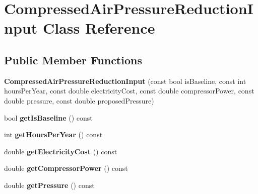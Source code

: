 \hypertarget{class_compressed_air_pressure_reduction_input}{}\section{Compressed\+Air\+Pressure\+Reduction\+Input Class Reference}
\label{class_compressed_air_pressure_reduction_input}
\subsection*{Public Member Functions}
\begin{DoxyCompactItemize}
\item 
\mbox{\label{class_compressed_air_pressure_reduction_input_af3bea875794e64c677c753cf3836b53b}} 
{\bfseries Compressed\+Air\+Pressure\+Reduction\+Input} (const bool is\+Baseline, const int hours\+Per\+Year, const double electricity\+Cost, const double compressor\+Power, const double pressure, const double proposed\+Pressure)
\item 
\mbox{\label{class_compressed_air_pressure_reduction_input_a0ab9cf8226a03688bb37d1f8bd55f488}} 
bool {\bfseries get\+Is\+Baseline} () const
\item 
\mbox{\label{class_compressed_air_pressure_reduction_input_a0a87586eacee27fcecc81c0be80a3f7d}} 
int {\bfseries get\+Hours\+Per\+Year} () const
\item 
\mbox{\label{class_compressed_air_pressure_reduction_input_a340d012ba7c477679a32f967832f9f0b}} 
double {\bfseries get\+Electricity\+Cost} () const
\item 
\mbox{\label{class_compressed_air_pressure_reduction_input_aea1dd940ecefcd0f67847db4f74b1a92}} 
double {\bfseries get\+Compressor\+Power} () const
\item 
\mbox{\label{class_compressed_air_pressure_reduction_input_a9eadd70a4dd28b9269ad5e552e386583}} 
double {\bfseries get\+Pressure} () const
\item 

\end{DoxyCompactItemize}
